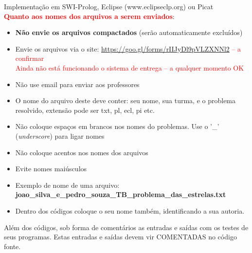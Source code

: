 \documentclass[a4paper,12pt]{article}
\begin{document}
\begin{flushleft}


\vspace{0.5cm}
 Implementação em SWI-Prolog, Eclipse (www.eclipseclp.org) ou Picat\\

\vspace{0.5cm}
 \textcolor{red}{\textbf{Quanto aos nomes dos arquivos a serem enviados}}:
\begin{itemize}
  \item \textbf{Não envie os arquivos compactados} (serão automaticamente excluídos)
  \item Envie os arquivos  via o site: \textcolor{red}{\url{https://goo.gl/forms/rIIJyDl9pVLZXNNl2}  -- a confirmar}\\
  \textcolor{red}{Ainda não está funcionando o sistema de entrega -- a qualquer momento OK}

  \item Não use email para enviar aos professores
  
  \item O nome do arquivo deste deve conter: seu nome,
  sua turma, e o problema resolvido, extensão pode ser txt, pl, ecl, pi etc.
  \item Não coloque espaços em brancos nos nomes do problemas. Use o '\_'  (\textit{underscore}) para ligar nomes
  
  \item Não coloque acentos nos nomes dos arquivos
  
  \item Evite nomes maiúsculos
  
  \item Exemplo de nome de uma arquivo: \\ \textbf{joao\_silva\_e\_pedro\_souza\_TB\_problema\_das\_estrelas.txt}
  
  \item Dentro dos códigos coloque o seu nome também, identificando a sua autoria.
  
\end{itemize}


\vspace{0.5cm}
 Além dos códigos, sob forma de comentários as 
entradas e saídas com os testes de seus programas. Estas
entradas e saídas devem vir COMENTADAS no código fonte.


\end{flushleft}
\end{document}
